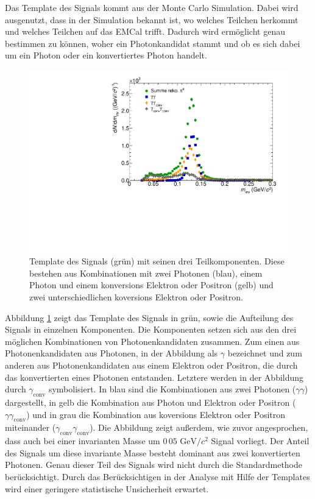 Das Template des Signals kommt aus der Monte Carlo Simulation.
Dabei wird ausgenutzt, dass in der Simulation bekannt ist, wo welches Teilchen herkommt und welches Teilchen auf das EMCal trifft.
Dadurch wird ermöglicht genau bestimmen zu können, woher ein Photonkandidat stammt und ob es sich dabei um ein Photon oder ein konvertiertes Photon handelt.
\begin{figure}[tp]
\centering
\includegraphics[width=.75\linewidth]{PeakTemplateMotivation10_Data_2016.pdf}
\caption{Template des Signals (grün) mit seinen drei Teilkomponenten.
Diese bestehen aus Kombinationen mit zwei Photonen (blau), einem Photon und einem konversions Elektron oder Positron (gelb) und zwei unterschiedlichen koversions Elektron oder Positron.}
\label{fig:SigTemp}
\end{figure}
\newline
Abbildung \ref{fig:SigTemp} zeigt das Template des Signals in grün, sowie die Aufteilung des Signals in einzelnen Komponenten.
Die Komponenten setzen sich aus den drei möglichen Kombinationen von Photonenkandidaten zusammen.
Zum einen aus Photonenkandidaten aus Photonen, in der Abbildung als $\gamma$ bezeichnet und zum anderen aus Photonenkandidaten aus einem Elektron oder Positron, die durch das konvertierten  eines Photonen entstanden.
Letztere werden in der Abbildung durch $\gamma_\text{conv}$ symbolisiert.
\newline
In blau sind die Kombinationen aus zwei Photonen ($\gamma\gamma$) dargestellt, in gelb die Kombination aus Photon und Elektron oder Positron ($\gamma\gamma_\text{conv}$) und in grau die Kombination aus koversions Elektron oder Positron miteinander ($\gamma_\text{conv}\gamma_\text{conv}$).
\newline
Die Abbildung zeigt außerdem, wie zuvor angesprochen, dass auch bei einer invarianten Masse um $0\,05 \text{ GeV}/c^{2}$ Signal vorliegt.
Der Anteil des Signals um diese invariante Masse besteht dominant aus zwei konvertierten Photonen.
Genau dieser Teil des Signals wird nicht durch die Standardmethode berücksichtigt.
Durch das Berücksichtigen in der Analyse mit Hilfe der Templates wird einer geringere statistische Unsicherheit erwartet.